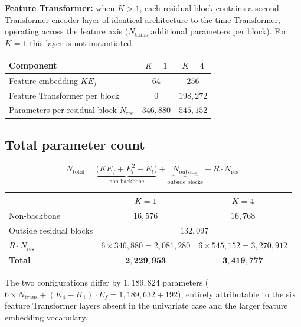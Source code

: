 \textbf{Feature Transformer:} when $K>1$, each residual block contains a
second Transformer encoder layer of identical architecture to the time
Transformer, operating across the feature axis ($N_{\mathrm{trans}}$
additional parameters per block). For $K=1$ this layer is not instantiated.

\begin{table}[h]
\centering
\begin{tabular}{lcc}
\toprule
Component & $K=1$ & $K=4$ \\
\midrule
Feature embedding $K E_f$ & $64$ & $256$ \\
Feature Transformer per block & $0$ & $198{,}272$ \\
\midrule
Parameters per residual block $N_{\mathrm{res}}$ & $346{,}880$ & $545{,}152$ \\
\bottomrule
\end{tabular}
\end{table}

\subsection{Total parameter count}

\[
N_{\mathrm{total}}
= \underbrace{\bigl(K E_f + E_t^2 + E_t\bigr)}_{\text{non-backbone}}
+ \underbrace{N_{\mathrm{outside}}}_{\text{outside blocks}}
+ R\cdot N_{\mathrm{res}}.
\]

\begin{table}[h]
\centering
\begin{tabular}{lcc}
\toprule
 & $K=1$ & $K=4$ \\
\midrule
Non-backbone & $16{,}576$ & $16{,}768$ \\
Outside residual blocks & \multicolumn{2}{c}{$132{,}097$} \\
$R \cdot N_{\mathrm{res}}$ & $6\times 346{,}880 = 2{,}081{,}280$ & $6\times 545{,}152 = 3{,}270{,}912$ \\
\midrule
\textbf{Total} & $\mathbf{2{,}229{,}953}$ & $\mathbf{3{,}419{,}777}$ \\
\bottomrule
\end{tabular}
\end{table}

The two configurations differ by $1{,}189{,}824$ parameters
($6 \times N_{\mathrm{trans}} + (K_4 - K_1)\cdot E_f
= 1{,}189{,}632 + 192$),
entirely attributable to the six feature Transformer layers absent in the
univariate case and the larger feature embedding vocabulary.